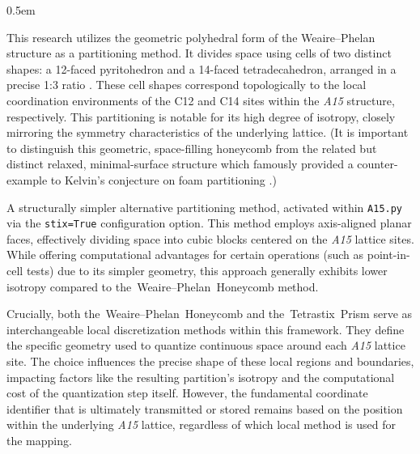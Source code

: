 \documentclass[10pt]{article}
\def\AAAB{\textit{A15}}
\def\WP{Weaire--Phelan}
\def\WPH{\WP{}~Honeycomb}
\def\TSP{Tetrastix~Prism}
\def\tWPH{the~\WP{}~Honeycomb}
\def\tTSP{the~\TSP{}}
\begin{document}
\begin{description} \itemsep0.5em
    \item[\WPH{} (WPH) Geometry:] This research utilizes the geometric polyhedral form of the \WP{} structure as a partitioning method. It divides space using cells of two distinct shapes: a 12-faced pyritohedron and a 14-faced tetradecahedron, arranged in a precise 1:3 ratio \cite{WeairePhelan1994}. These cell shapes correspond topologically to the local coordination environments of the C12 and C14 sites within the \AAAB{} structure, respectively. This partitioning is notable for its high degree of isotropy, closely mirroring the symmetry characteristics of the underlying lattice. (It is important to distinguish this geometric, space-filling honeycomb from the related but distinct relaxed, minimal-surface structure which famously provided a counter-example to Kelvin's conjecture on foam partitioning \cite{Kelvin1887, Kusner1996, WeaireHutzler2001}.)
    \item[\TSP{} (TSP) Geometry:] A structurally simpler alternative partitioning method, activated within \texttt{A15.py} via the \texttt{stix=True} configuration option. This method employs axis-aligned planar faces, effectively dividing space into cubic blocks centered on the \AAAB{} lattice sites. While offering computational advantages for certain operations (such as point-in-cell tests) due to its simpler geometry, this approach generally exhibits lower isotropy compared to \tWPH{} method.
\end{description}

Crucially, both \tWPH{} and \tTSP{} serve as interchangeable local discretization methods within this framework. They define the specific geometry used to quantize continuous space around each \AAAB{} lattice site. The choice influences the precise shape of these local regions and boundaries, impacting factors like the resulting partition's isotropy and the computational cost of the quantization step itself. However, the fundamental coordinate identifier that is ultimately transmitted or stored remains based on the position within the underlying \AAAB{} lattice, regardless of which local method is used for the mapping.
\end{document}
